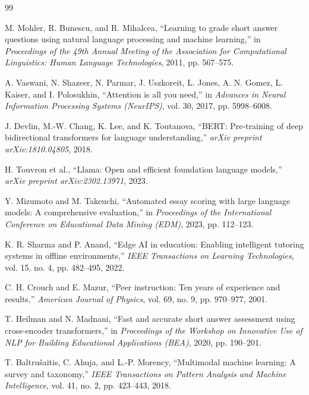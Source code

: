 \begin{thebibliography}{99}

M. Mohler, R. Bunescu, and R. Mihalcea, ``Learning to grade short answer questions using natural language processing and machine learning,'' in \textit{Proceedings of the 49th Annual Meeting of the Association for Computational Linguistics: Human Language Technologies}, 2011, pp. 567--575.

A. Vaswani, N. Shazeer, N. Parmar, J. Uszkoreit, L. Jones, A. N. Gomez, L. Kaiser, and I. Polosukhin, ``Attention is all you need,'' in \textit{Advances in Neural Information Processing Systems (NeurIPS)}, vol. 30, 2017, pp. 5998--6008.

J. Devlin, M.-W. Chang, K. Lee, and K. Toutanova, ``BERT: Pre-training of deep bidirectional transformers for language understanding,'' \textit{arXiv preprint arXiv:1810.04805}, 2018.

H. Touvron et al., ``Llama: Open and efficient foundation language models,'' \textit{arXiv preprint arXiv:2302.13971}, 2023.

Y. Mizumoto and M. Takeuchi, ``Automated essay scoring with large language models: A comprehensive evaluation,'' in \textit{Proceedings of the International Conference on Educational Data Mining (EDM)}, 2023, pp. 112--123.

K. R. Sharma and P. Anand, ``Edge AI in education: Enabling intelligent tutoring systems in offline environments,'' \textit{IEEE Transactions on Learning Technologies}, vol. 15, no. 4, pp. 482--495, 2022.

C. H. Crouch and E. Mazur, ``Peer instruction: Ten years of experience and results,'' \textit{American Journal of Physics}, vol. 69, no. 9, pp. 970--977, 2001.

T. Heilman and N. Madnani, ``Fast and accurate short answer assessment using cross-encoder transformers,'' in \textit{Proceedings of the Workshop on Innovative Use of NLP for Building Educational Applications (BEA)}, 2020, pp. 190--201.

T. Baltru\v{s}aitis, C. Ahuja, and L.-P. Morency, ``Multimodal machine learning: A survey and taxonomy,'' \textit{IEEE Transactions on Pattern Analysis and Machine Intelligence}, vol. 41, no. 2, pp. 423--443, 2018.


\end{thebibliography}
